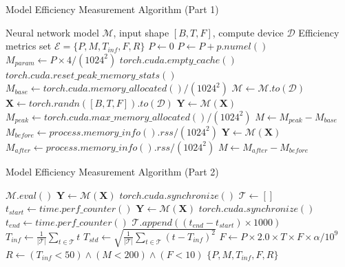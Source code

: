 \documentclass[lettersize,journal]{IEEEtran}
\begin{document}
\begin{algorithm}[!h]
\caption{Model Efficiency Measurement Algorithm (Part 1)}
\label{alg:model_efficiency}
\begin{algorithmic}[1]
\REQUIRE Neural network model $\mathcal{M}$, input shape $[B, T, F]$, compute device $\mathcal{D}$
\ENSURE Efficiency metrics set $\mathcal{E} = \{P, M, T_{inf}, F, R\}$
\STATE $P \leftarrow 0$ 
        \STATE $P \leftarrow P + p.numel()$
    \ENDIF
\ENDFOR
\STATE $M_{param} \leftarrow P \times 4 / (1024^2)$ 
    \STATE $torch.cuda.empty\_cache()$
    \STATE $torch.cuda.reset\_peak\_memory\_stats()$
    \STATE $M_{base} \leftarrow torch.cuda.memory\_allocated() / (1024^2)$
    \STATE $\mathcal{M} \leftarrow \mathcal{M}.to(\mathcal{D})$
    \STATE $\mathbf{X} \leftarrow torch.randn([B, T, F]).to(\mathcal{D})$
    \STATE $\mathbf{Y} \leftarrow \mathcal{M}(\mathbf{X})$ 
    \STATE $M_{peak} \leftarrow torch.cuda.max\_memory\_allocated() / (1024^2)$
    \STATE $M \leftarrow M_{peak} - M_{base}$ 
\ELSE
    \STATE $M_{before} \leftarrow process.memory\_info().rss / (1024^2)$
    \STATE $\mathbf{Y} \leftarrow \mathcal{M}(\mathbf{X})$
    \STATE $M_{after} \leftarrow process.memory\_info().rss / (1024^2)$
    \STATE $M \leftarrow M_{after} - M_{before}$
\ENDIF
\end{algorithmic}
\end{algorithm}

\begin{algorithm}[!h]
\caption{Model Efficiency Measurement Algorithm (Part 2)}
\label{alg:model_efficiency_part2}
\addtocounter{algorithm}{-1} %
\begin{algorithmic}[1]
\STATE $\mathcal{M}.eval()$ 
    \STATE $\mathbf{Y} \leftarrow \mathcal{M}(\mathbf{X})$ 
\ENDFOR
{}
    \STATE $torch.cuda.synchronize()$
\ENDIF
\STATE $\mathcal{T} \leftarrow []$ 
    \STATE $t_{start} \leftarrow time.perf\_counter()$
    \STATE $\mathbf{Y} \leftarrow \mathcal{M}(\mathbf{X})$
        \STATE $torch.cuda.synchronize()$
    \ENDIF
    \STATE $t_{end} \leftarrow time.perf\_counter()$
    \STATE $\mathcal{T}.append((t_{end} - t_{start}) \times 1000)$ 
\ENDFOR
\STATE $T_{inf} \leftarrow \frac{1}{|\mathcal{T}|} \sum_{t \in \mathcal{T}} t$ 
\STATE $T_{std} \leftarrow \sqrt{\frac{1}{|\mathcal{T}|} \sum_{t \in \mathcal{T}} (t - T_{inf})^2}$ 
\STATE $F \leftarrow P \times 2.0 \times T \times F \times \alpha / 10^9$ 
\STATE $R \leftarrow (T_{inf} < 50) \land (M < 200) \land (F < 10)$ 
\STATE \RETURN $\{P, M, T_{inf}, F, R\}$
\end{algorithmic}
\end{algorithm}
\end{document}

